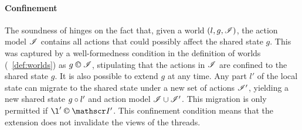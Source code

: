 

\paragraph{Confinement}
The soundness of \colosl hinges on the fact that,  given a world $(l, g, \mathscr{I})$, 
the action model $\mathscr{I}$ contains all actions that could possibly affect the 
shared state $g$. This was captured by a well-formedness condition in the
definition of worlds (~\ref{def:worlds}) as $g\confines \lmod$, 
stipulating that the actions in $\mathscr{I}$ are confined to the
shared state $g$. It is also possible to extend $g$ at any time.  Any
part $l'$ of the local state can migrate to the shared state under
a new set of actions $\mathscr{I}'$, yielding a new shared state $g\circ
l'$ and action model $\mathscr{I} \cup \mathscr{I}'$. This migration is only
permitted if $\l ' \confines \lmod'$. This confinement condition means
that the extension does not invalidate the views of the threads.


